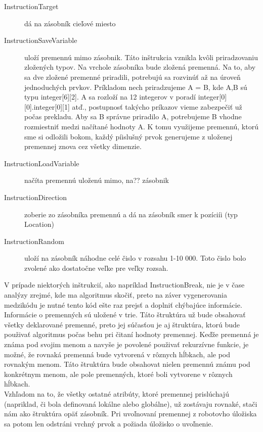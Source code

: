 \begin{description}
\item [InstructionTarget] dá na zásobník cieľové miesto
\item [InstructionSaveVariable] uloží premennú mimo zásobnik. Táto inštrukcia vznikla kvôli priradzovaniu zložených typov. Na vrchole zásobníka bude zložená premenná. Na to, aby sa dve zložené premenné priradili, potrebujú sa rozvinúť až na úroveň jednoduchých prvkov. Príkladom nech priradzujeme A = B, kde A,B sú typu integer[6][2]. A sa rozloží na 12 integerov v poradí integer[0][0].integer[0][1] atď., postupnosť takýcho príkazov vieme zabezpečiť už počas prekladu. Aby sa B správne priradilo A, potrebujeme B vhodne rozmiestniť medzi načítané hodnoty A. K tomu využijeme premennú, ktorú sme si odložili bokom, každý píislušný prvok generujeme z uloženej premennej znova cez všetky dimenzie.
\item [InstructionLoadVariable] načíta premennú uloženú mimo, na?? zásobnik
\item [InstructionDirection ] zoberie zo zásobníka premennú a dá na zásobník smer k pozíciíi (typ Location)
\item [InstructionRandom] uloží na zásobník náhodne celé čislo v rozsahu 1-10 000. Toto čislo bolo zvolené ako dostatočne veľke pre veľky rozsah. %
\end{description}

V prípade niektorých inštrukcií, ako napríklad InstructionBreak, nie je v čase analýzy zrejmé, kde ma algoritmus skočiť, preto na záver vygenerovania medzikódu je nutné tento kód ešte raz prejsť a doplniť chýbajúce informácie. \\

Informácie o premenných sú uložené v trie. %
Táto štruktúra už bude obsahovať všetky deklarované premenné, preto jej súčasťou je aj štruktúra, ktorú bude použivať algoritmus počas behu pri čitaní hodnoty premennej. Keďže premenná je známa pod svojim menom a navyše je povolené použivať rekurzívne funkcie, je možné, že rovnaká premenná bude vytvorená v rôznych hĺbkach, ale pod rovnakým menom. Táto štruktúra bude obsahovat nielen premennú známu pod konkrétnym menom, ale pole premenných, ktoré boli vytvorene v rôznych hĺbkach.\\
Vzhľadom na to, že všetky ostatné atribúty, ktoré premennej prislúchajú (napriklad, či bola definovaná lokálne alebo globálne), už zostávaju rovnaké, stači nám ako štruktúra opäť zásobník. Pri uvoľnovaní premennej z robotovho úložiska sa potom  len odstráni vrchný prvok a požiada úložisko o uvoľnenie.

